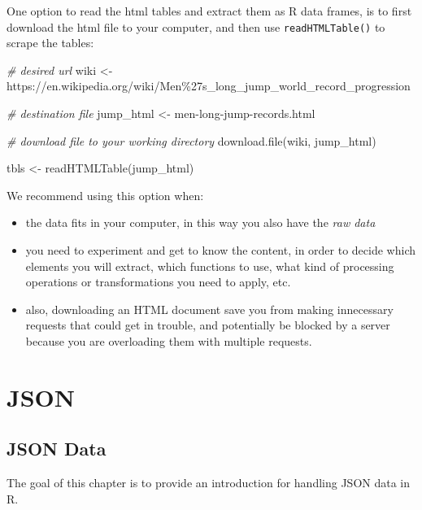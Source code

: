 \documentclass[
]{book}
\newenvironment{Shaded}{\begin{snugshade}}{\end{snugshade}}
\newcommand{\CommentTok}[1]{\textcolor[rgb]{0.56,0.35,0.01}{\textit{#1}}}
\newcommand{\FunctionTok}[1]{\textcolor[rgb]{0.00,0.00,0.00}{#1}}
\newcommand{\NormalTok}[1]{#1}
\newcommand{\OtherTok}[1]{\textcolor[rgb]{0.56,0.35,0.01}{#1}}
\newcommand{\StringTok}[1]{\textcolor[rgb]{0.31,0.60,0.02}{#1}}
\providecommand{\tightlist}{%
  \setlength{\itemsep}{0pt}\setlength{\parskip}{0pt}}
\begin{document}
One option to read the html tables and extract them as R data frames, is to
first download the html file to your computer, and then use \texttt{readHTMLTable()}
to scrape the tables:

\begin{Shaded}
\begin{Highlighting}[]
\CommentTok{\# desired url}
\NormalTok{wiki }\OtherTok{\textless{}{-}} \StringTok{\textquotesingle{}https://en.wikipedia.org/wiki/Men\%27s\_long\_jump\_world\_record\_progression\textquotesingle{}}

\CommentTok{\# destination file}
\NormalTok{jump\_html }\OtherTok{\textless{}{-}} \StringTok{\textquotesingle{}men{-}long{-}jump{-}records.html\textquotesingle{}}

\CommentTok{\# download file to your working directory}
\FunctionTok{download.file}\NormalTok{(wiki, jump\_html)}

\NormalTok{tbls }\OtherTok{\textless{}{-}} \FunctionTok{readHTMLTable}\NormalTok{(jump\_html)}
\end{Highlighting}
\end{Shaded}

We recommend using this option when:

\begin{itemize}
\tightlist
\item
  the data fits in your computer, in this way you also have the \emph{raw data}
\item
  you need to experiment and get to know the content, in order to decide
  which elements you will extract, which functions to use, what kind of processing
  operations or transformations you need to apply, etc.
\item
  also, downloading an HTML document save you from making innecessary requests
  that could get in trouble, and potentially be blocked by a server because you
  are overloading them with multiple requests.
\end{itemize}

\hypertarget{part-json}{%
\part{JSON}\label{part-json}}

\hypertarget{json}{%
\chapter{JSON Data}\label{json}}

The goal of this chapter is to provide an introduction for handling JSON data
in R.
\end{document}

